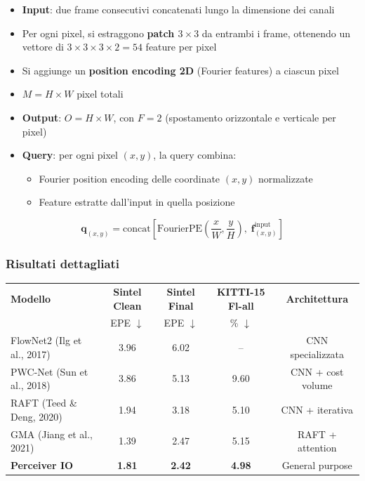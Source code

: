 \documentclass[12pt,a4paper]{article}
\begin{document}
\begin{itemize}
    \item \textbf{Input}: due frame consecutivi concatenati lungo la dimensione dei canali
    \item Per ogni pixel, si estraggono \textbf{patch $3 \times 3$} da entrambi i frame, ottenendo un vettore di $3 \times 3 \times 3 \times 2 = 54$ feature per pixel
    \item Si aggiunge un \textbf{position encoding 2D} (Fourier features) a ciascun pixel
    \item $M = H \times W$ pixel totali
    \item \textbf{Output}: $O = H \times W$, con $F = 2$ (spostamento orizzontale e verticale per pixel)
    \item \textbf{Query}: per ogni pixel $(x, y)$, la query combina:
    \begin{itemize}
        \item Fourier position encoding delle coordinate $(x, y)$ normalizzate
        \item Feature estratte dall'input in quella posizione
    \end{itemize}
\end{itemize}

\[
\mathbf{q}_{(x,y)} = \text{concat}\!\left[\text{FourierPE}\!\left(\frac{x}{W}, \frac{y}{H}\right), \; \mathbf{f}_{(x,y)}^{\text{input}}\right]
\]

\subsubsection{Risultati dettagliati}

\begin{center}
\begin{tabular}{lcccc}
\toprule
\textbf{Modello} & \textbf{Sintel Clean} & \textbf{Sintel Final} & \textbf{KITTI-15 Fl-all} & \textbf{Architettura} \\
 & EPE $\downarrow$ & EPE $\downarrow$ & \% $\downarrow$ & \\
\midrule
FlowNet2 (Ilg et al., 2017) & 3.96 & 6.02 & -- & CNN specializzata \\
PWC-Net (Sun et al., 2018) & 3.86 & 5.13 & 9.60 & CNN + cost volume \\
RAFT (Teed \& Deng, 2020) & 1.94 & 3.18 & 5.10 & CNN + iterativa \\
GMA (Jiang et al., 2021) & 1.39 & 2.47 & 5.15 & RAFT + attention \\
\midrule
\textbf{Perceiver IO} & \textbf{1.81} & \textbf{2.42} & \textbf{4.98} & General purpose \\
\bottomrule
\end{tabular}
\end{center}
\end{document}
